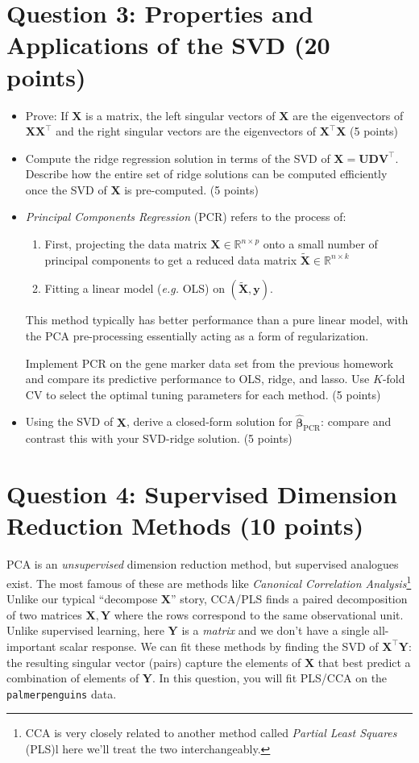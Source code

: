 \documentclass[10pt]{article}
\newcommand{\R}{\mathbb{R}}
\newcommand{\bX}{\bm{X}}
\newcommand{\by}{\bm{y}}
\newcommand{\bU}{\bm{U}}
\newcommand{\bV}{\bm{V}}
\newcommand{\bD}{\bm{D}}
\newcommand{\bY}{\bm{Y}}
\newcommand{\bbeta}{\bm{\beta}}
\begin{document}
\section*{Question 3: Properties and Applications of the SVD (20 points)}
\begin{itemize}
    \item Prove: If $\bX$ is a matrix, the left singular vectors of $\bX$ are the eigenvectors of $\bX\bX^{\top}$ and the right singular vectors are the eigenvectors of $\bX^{\top}\bX$ (5 points)
    \item Compute the ridge regression solution in terms of the SVD of $\bX = \bU \bD \bV^{\top}$. Describe how the entire set of ridge solutions can be computed efficiently once the SVD of $\bX$ is pre-computed. (5 points)
    \item \emph{Principal Components Regression} (PCR) refers to the process of:
\begin{enumerate}
    \item First, projecting the data matrix $\bX \in \R^{n \times p}$ onto a small number of principal components to get a reduced data matrix $\tilde{\bX} \in \R^{n \times k}$
    \item Fitting a linear model (\emph{e.g.} OLS) on $(\tilde{\bX}, \by)$. 
\end{enumerate}
This method typically has better performance than a pure linear model, with the PCA pre-processing essentially acting as a form of regularization.  

Implement PCR on the gene marker data set from the previous homework and compare its predictive performance to OLS, ridge, and lasso. Use $K$-fold CV to select the optimal tuning parameters for each method. (5 points)
\item Using the SVD of $\bX$, derive a closed-form solution for $\hat{\bbeta}_{\text{PCR}}$: compare and contrast this with your SVD-ridge solution. (5 points)
\end{itemize}

\section*{Question 4: Supervised Dimension Reduction Methods (10 points)}

PCA is an \emph{unsupervised} dimension reduction method, but supervised analogues exist. The most famous of these are methods like \emph{Canonical Correlation Analysis}\footnote{CCA is very closely related to another method called \emph{Partial Least Squares} (PLS)l here we'll treat the two interchangeably.} Unlike our typical ``decompose $\bX$'' story, CCA/PLS finds a paired decomposition of two matrices $\bX, \bY$ where the rows correspond to the same observational unit. Unlike supervised learning, here $\bY$ is a \emph{matrix} and we don't have a single all-important scalar response. We can fit these methods by finding the SVD of $\bX^{\top}\bY$: the resulting singular vector (pairs) capture the elements of $\bX$ that best predict a combination of elements of $\bY$. In this question, you will fit PLS/CCA on the \texttt{palmerpenguins} data. 
\end{document}
